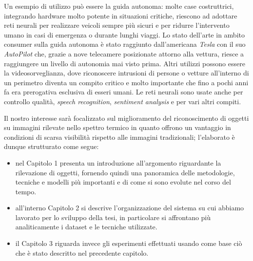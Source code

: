 Un esempio di utilizzo può essere la guida autonoma: molte case costruttrici, integrando hardware molto potente in situazioni critiche, riescono ad  adottare reti neurali per realizzare veicoli sempre più sicuri e per ridurre l'intervento umano in casi di emergenza o durante lunghi viaggi. 
Lo stato dell'arte in ambito consumer sulla guida autonoma è stato raggiunto dall'americana \textit{Tesla} con il suo \textit{AutoPilot} che, 
grazie a nove telecamere posizionate attorno alla vettura, riesce a raggiungere un livello di autonomia mai visto prima.
Altri utilizzi possono essere la videosorveglianza, dove riconoscere intrusioni di persone o vetture all'interno di un perimetro diventa un compito critico e molto importante che fino a pochi anni fa era prerogativa esclusiva di esseri umani. 
Le reti neurali sono usate anche per controllo qualità, \textit{speech recognition}, \textit{sentiment analysis} e per vari altri compiti. 


Il nostro interesse sarà focalizzato sul miglioramento del riconoscimento di oggetti su immagini rilevate nello spettro termico in quanto offrono un vantaggio in condizioni di scarsa visibilità rispetto alle immagini tradizionali; l'elaborato è dunque strutturato come segue:
\begin{itemize}
    \item nel Capitolo 1 presenta un introduzione all'argomento riguardante la rilevazione di oggetti, fornendo quindi una panoramica delle metodologie, tecniche e modelli più importanti e di come si sono evolute nel corso del tempo. 
    \item all'interno Capitolo 2 si descrive l'organizzazione del sistema su cui abbiamo lavorato per lo sviluppo della tesi, in particolare si affrontano più analiticamente i dataset e le tecniche utilizzate. 
    \item il Capitolo 3 riguarda invece gli esperimenti effettuati usando come base ciò che è stato descritto nel precedente capitolo. 
\end{itemize}
